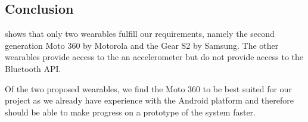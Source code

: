 
\subsection{Conclusion}

 shows that only two wearables fulfill our requirements, namely the second generation Moto 360 by Motorola and the Gear S2 by Samsung. The other wearables provide access to the an accelerometer but do not provide access to the Bluetooth API. 

Of the two proposed wearables, we find the Moto 360 to be best suited for our project as we already have experience with the Android platform and therefore should be able to make progress on a prototype of the system faster.


